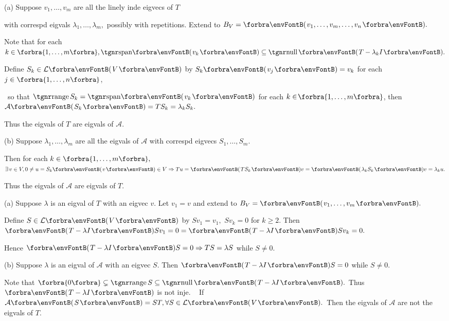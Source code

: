 \documentclass[a4paper, 11pt, UTF8]{article}
\begin{document}
\begin{large}
\par\quad
(a) Suppose $v_1,\dots,v_m$ are all the linely inde eigvecs of $T$\par\quad\Ha
with correspd eigvals $\lambda_1,\dots,\lambda_m,$ possibly with repetitions. Extend to $B_V=\Par{v_1,\dots,v_m,\dots,v_n}.$\par\quad\Ha
Note that for each $k\in\Bra{1,\dots,m},\Span{v_k}\subseteq\null\Par{T-\lambda_k I}.$\par\quad\Ha
Define $S_k\in\Lm{V}$ by $S_k\Par{v_j}=v_k$ for each $j\in\Bra{1,\dots,n}$,\par\quad\Ha\qquad\,
so that $\range S_k=\Span{v_k}$ for each $k\in\!\Bra{1,\dots,m}$, then $\mathcal{A}\Par{S_k}=TS_k=\lambda_k S_k.$\par\quad\Ha
Thus the eigvals of $T$ are eigvals of $\mathcal{A}.$\par\quad
(b) Suppose $\lambda_1,\dots,\lambda_m$ are all the eigvals of $\mathcal{A}$ with correspd eigvecs $S_1,\dots,S_m.$\par\quad\Hb
Then for each $k\in\Bra{1,\dots,m},$ $\exists\,v\in V,0\neq u=S_k\Par{v}\in V\Rightarrow Tu=\Par{TS_k} v=\Par{\lambda_k S_k} v=\lambda_k u.$\par\quad\Hb
Thus the eigvals of $\mathcal{A}$ are eigvals of $T.$\PfEnd\vspace{2pt}\quad
\Or \par\quad
(a) Suppose $\lambda$ is an eigval of $T$ with an eigvec $v.$ Let $v_1=v$ and extend to $B_V=\Par{v_1,\dots,v_m}.$\par\quad\Ha
Define $S\in\Lm{V}$ by $Sv_1=v_1,\,\,Sv_k=0$ for $k\geqslant 2.$ Then $\Par{T-\lambda I}Sv_1=0=\Par{T-\lambda I}Sv_k=0.$\par\quad\Ha
Hence $\Par{T-\lambda I}S=0\Rightarrow TS=\lambda S$ while $S\neq 0.$\par\quad
(b) Suppose $\lambda$ is an eigval of $\mathcal{A}$ with an eigvec $S.$ Then $\Par{T-\lambda I}S=0$ while $S\neq 0.$\par\quad\Hb
Note that $\zeroSubs\subsetneq\range S\subseteq\null\Par{T-\lambda I}.$ Thus $\Par{T-\lambda I}$ is not inje.\PfEnd\vspace{4pt}
\Comment\,\,\, {If $\mathcal{A}\Par{S}=ST,\forall S\in\Lm{V}.$ Then the eigvals of $\mathcal{A}$ are not the eigvals of $T.$}
\SepLine\pagebreak


\end{large}
\end{document}
